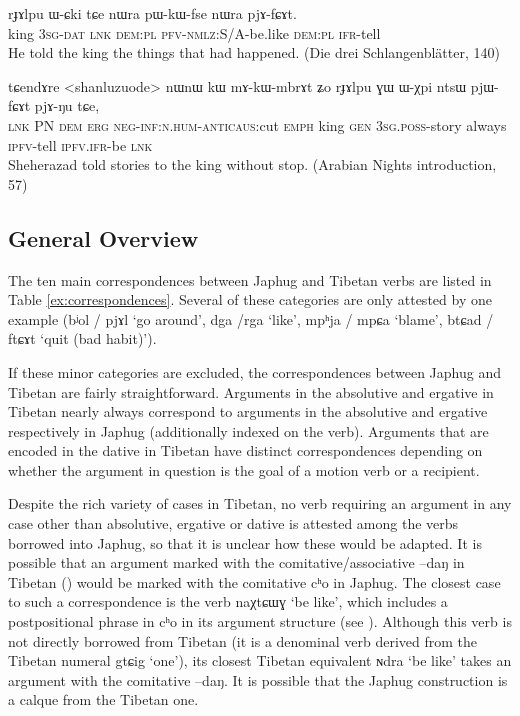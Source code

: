 \documentclass[oldfontcommands,oneside,a4paper,11pt]{article}
\newcommand{\ipa}[1]{{\phon \mbox{#1}}} %
\begin{document}
\begin{exe}
\ex \label{ex:pjAfCAt}
\gll
  \ipa{rɟɤlpu} 	\ipa{ɯ-ɕki} 	\ipa{tɕe} 	\ipa{nɯra} 	\ipa{pɯ-kɯ-fse} 	\ipa{nɯra} 	\ipa{pjɤ-fɕɤt.} \\
  king \textsc{3sg-dat} \textsc{lnk} \textsc{dem:pl} \textsc{pfv-nmlz}:S/A-be.like  \textsc{dem:pl} \textsc{ifr}-tell \\
  \glt He told the king the things that had happened. (Die drei Schlangenblätter, 140)
\end{exe}

\begin{exe}
\ex \label{ex:pjWfCAt}
\gll
  \ipa{tɕendɤre} 	<shanluzuode> 	\ipa{nɯnɯ} 	\ipa{kɯ} 	\ipa{mɤ-kɯ-mbrɤt} 	\ipa{ʑo} 	\ipa{rɟɤlpu} 	\ipa{ɣɯ} 	\ipa{ɯ-χpi} 	\ipa{ntsɯ} 	\ipa{pjɯ-fɕɤt} 	\ipa{pjɤ-ŋu} 	\ipa{tɕe,} \\
  \textsc{lnk} PN \textsc{dem} \textsc{erg} \textsc{neg-inf:n.hum}-\textsc{anticaus}:cut \textsc{emph} king \textsc{gen} \textsc{3sg.poss}-story always \textsc{ipfv}-tell \textsc{ipfv.ifr}-be \textsc{lnk} \\
\glt Sheherazad told stories to the king without stop. (Arabian Nights introduction, 57)
\end{exe}


\subsection{General Overview}
The ten main correspondences between Japhug and Tibetan verbs are listed in Table \ref{ex:correspondences}. Several of these categories are only attested by one example (\ipa{bʲol} / \ipa{pjɤl} `go around', \ipa{dga} /\ipa{rga} `like', \ipa{mpʰja} / \ipa{mpɕa} `blame', \ipa{btɕad} / \ipa{ftɕɤt} `quit (bad habit)'). 

If these minor categories are excluded, the correspondences between Japhug and Tibetan are fairly straightforward. Arguments in the absolutive and ergative in Tibetan nearly always correspond to arguments in the absolutive and ergative respectively in Japhug (additionally indexed on the verb). Arguments that are encoded in the dative in Tibetan have distinct correspondences depending on whether the argument in question is the goal of a motion verb or a recipient.

Despite the rich variety of cases in Tibetan, no verb requiring an argument in any case other than absolutive, ergative or dative is attested among the verbs borrowed into Japhug, so that it is unclear how these would be adapted. It is possible that an argument marked with the comitative/associative \ipa{--daŋ} in Tibetan (\citealt{tournadre10cases, hill12bas}) would be marked with the comitative \ipa{cʰo} in Japhug. The closest case to such a correspondence is the verb \ipa{naχtɕɯɣ} `be like', which includes a postpositional phrase in \ipa{cʰo} in its argument structure (see \citealt[273]{jacques14linking}). Although this verb is not directly borrowed from Tibetan (it is a denominal verb derived from the Tibetan numeral \ipa{gtɕig} `one'), its closest Tibetan equivalent \ipa{ɴdra} `be like' takes an argument with the comitative \ipa{--daŋ}. It is possible that the Japhug construction is a calque from the Tibetan one.
\end{document}
